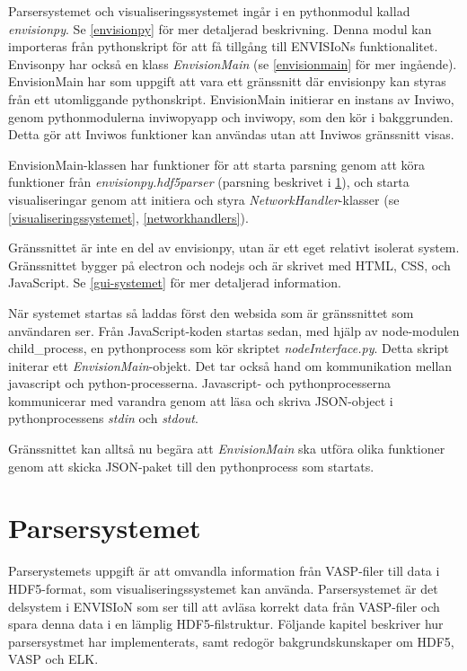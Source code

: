 \documentclass[10pt,oneside,swedish]{article}
\begin{document}
Parsersystemet och visualiseringssystemet ingår i en pythonmodul kallad
\emph{envisionpy}. Se \ref{envisionpy} för mer detaljerad beskrivning. Denna
modul kan importeras från pythonskript för att få tillgång till
ENVISIoNs funktionalitet. Envisonpy har också en klass
\emph{EnvisionMain} (se \ref{envisionmain} för mer ingående). EnvisionMain
har som uppgift att vara ett gränssnitt där envisionpy kan styras från
ett utomliggande pythonskript. EnvisionMain initierar en instans av
Inviwo, genom pythonmodulerna inviwopyapp och inviwopy, som den kör i
bakggrunden. Detta gör att Inviwos funktioner kan användas utan att
Inviwos gränssnitt visas.

EnvisionMain-klassen har funktioner för att starta parsning genom att
köra funktioner från \emph{envisionpy.hdf5parser} (parsning beskrivet i \ref{parsersystemet}), och starta visualiseringar genom att initiera och
styra \emph{NetworkHandler}-klasser (se \ref{visualiseringssystemet},
\ref{networkhandlers}).

Gränssnittet är inte en del av envisionpy, utan är ett eget relativt
isolerat system. Gränssnittet bygger på electron och nodejs och är
skrivet med HTML, CSS, och JavaScript. Se \ref{gui-systemet} för mer
detaljerad information.

När systemet startas så laddas först den websida som är gränssnittet som
användaren ser. Från JavaScript-koden startas sedan, med hjälp av
node-modulen child\_process, en pythonprocess som kör skriptet
\emph{nodeInterface.py}. Detta skript initerar ett
\emph{EnvisionMain}-objekt. Det tar också hand om kommunikation mellan
javascript och python-processerna. Javascript- och pythonprocesserna
kommunicerar med varandra genom att läsa och skriva JSON-object i
pythonprocessens \emph{stdin} och \emph{stdout}.

Gränssnittet kan alltså nu begära att \emph{EnvisionMain} ska utföra
olika funktioner genom att skicka JSON-paket till den pythonprocess som
startats.

\newpage
\section{Parsersystemet}\label{parsersystemet}

Parserystemets uppgift är att omvandla information från VASP-filer till
data i HDF5-format, som visualiseringssystemet kan använda.
Parsersystemet är det delsystem i ENVISIoN som ser till att avläsa
korrekt data från VASP-filer och spara denna data i en lämplig
HDF5-filstruktur. Följande kapitel beskriver hur parsersystmet har
implementerats, samt redogör bakgrundskunskaper om HDF5, VASP och ELK.
\end{document}
